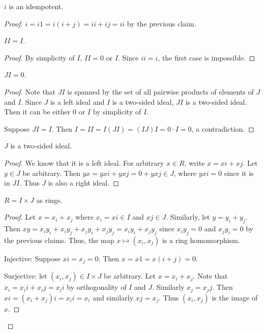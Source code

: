       \begin{claim}
        $i$ is an idempotent.
      \end{claim}
      \begin{proof}
        $i = i 1 = i(i + j) = i i + i j = i i$ by the previous claim.

      \begin{claim}
        $I I = I$.
      \end{claim}
      \begin{proof}
        By simplicity of $I$, $I I = 0$ or $I$. Since $ i i = i$, the first case is impossible.
      \end{proof}

      \begin{claim}
        $J I = 0$.
      \end{claim}
      \begin{proof}
        Note that $JI$ is spanned by the set of all pairwise products of elements of $J$ and $I$. Since $J$ is a left ideal and $I$ is a two-sided ideal, $JI$ is a two-sided ideal. Then it can be either $0$ or $I$ by simplicity of $I$. 

        Suppose $JI = I$. Then $I = I I = I (J I) = (I J) I = 0 \cdot I = 0$, a contradiction.
      \end{proof}

      \begin{claim}
        $J$ is a two-sided ideal.
      \end{claim}
      \begin{proof}
        We know that it is a left ideal. For arbitrary $x \in R$, write $x = x i + x j$. Let $y \in J$ be arbitrary. Then $y x = y x i + y x j = 0 + y x j \in J$, where $y x i = 0$ since it is in $J I$. Thus $J$ is also a right ideal.
      \end{proof}

      \begin{claim}
        $ R = I \times J$ as rings.
      \end{claim}
      \begin{proof}
        Let $x = x_i + x_j$ where $x_i = x i \in I$ and $x j \in J$. Similarly, let $y = y_i + y_j$. Then $x y = x_i y_i + x_i y_j + x_j y_i + x_j y_j = x_i y_i + x_j y_j$ since $x_i y_j = 0$ and $x_j y_i = 0$ by the previous claims. Thus, the map $x \mapsto (x_i, x_j)$ is a ring homomorphism.

        Injective: Suppose $x i = x_j = 0$. Then $x = x 1 = x (i + j) = 0$.

        Surjective: let $(x_i, x_j)\in I \times J$ be arbitrary. Let $x = x_i + x_j$. Note that $x_i = x_i i + x_i j = x_i i$ by orthogonality of $I$ and $J$. Similarly $x_j = x_j j$. Then $x i = (x_i + x_j) i = x_i i = x_i$ and similarly $x j = x_j$. Thus $(x_i, x_j)$ is the image of $x$.
      \end{proof}


\end{proof}
